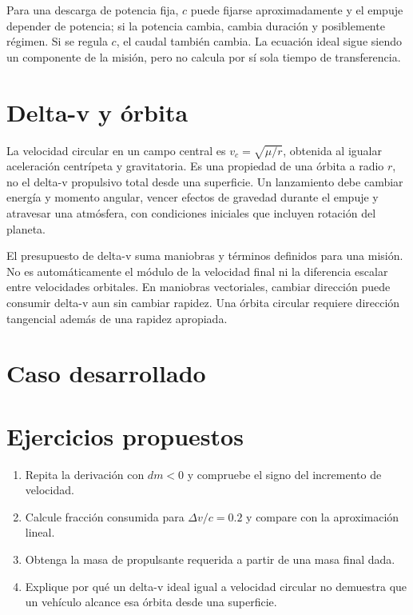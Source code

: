 Para una descarga de potencia fija, $c$ puede fijarse aproximadamente y el empuje depender de potencia; si la potencia cambia, cambia duración y posiblemente régimen. Si se regula $c$, el caudal también cambia. La ecuación ideal sigue siendo un componente de la misión, pero no calcula por sí sola tiempo de transferencia.
\section{Delta-v y órbita}
La velocidad circular en un campo central es $v_c=\sqrt{\mu/r}$, obtenida al igualar aceleración centrípeta y gravitatoria. Es una propiedad de una órbita a radio $r$, no el delta-v propulsivo total desde una superficie. Un lanzamiento debe cambiar energía y momento angular, vencer efectos de gravedad durante el empuje y atravesar una atmósfera, con condiciones iniciales que incluyen rotación del planeta.

El presupuesto de delta-v suma maniobras y términos definidos para una misión. No es automáticamente el módulo de la velocidad final ni la diferencia escalar entre velocidades orbitales. En maniobras vectoriales, cambiar dirección puede consumir delta-v aun sin cambiar rapidez. Una órbita circular requiere dirección tangencial además de una rapidez apropiada.
\section{Caso desarrollado}

\section{Ejercicios propuestos}
\begin{enumerate}
\item Repita la derivación con $dm<0$ y compruebe el signo del incremento de velocidad.
\item Calcule fracción consumida para $\Delta v/c=0.2$ y compare con la aproximación lineal.
\item Obtenga la masa de propulsante requerida a partir de una masa final dada.
\item Explique por qué un delta-v ideal igual a velocidad circular no demuestra que un vehículo alcance esa órbita desde una superficie.
\end{enumerate}


\studiumchaptercheck
